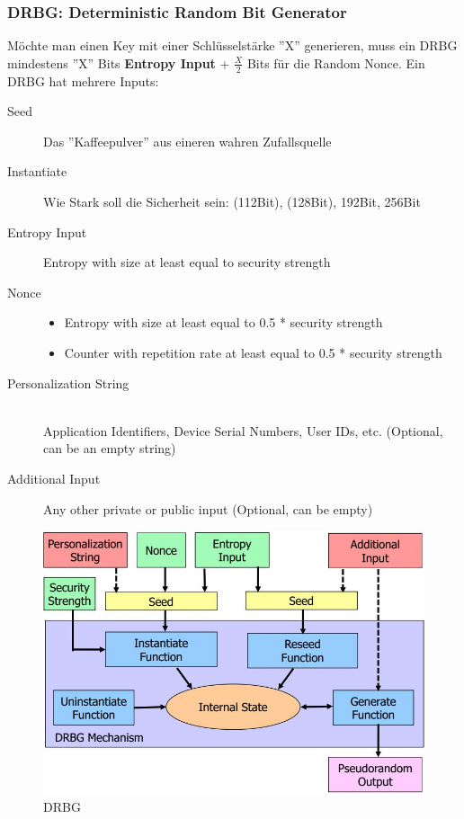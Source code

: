 \subsubsection{DRBG: Deterministic Random Bit Generator}
Möchte man einen Key mit einer Schlüsselstärke ''X'' generieren, muss ein DRBG mindestens ''X'' Bits \textbf{Entropy Input} + $\frac{X}{2}$ Bits für die Random Nonce. Ein DRBG hat mehrere Inputs:


\begin{description}
	\item[Seed]	Das ''Kaffeepulver'' aus eineren wahren Zufallsquelle
	\item[Instantiate] Wie Stark soll die Sicherheit sein: (112Bit), (128Bit), 192Bit, 256Bit
	\item[Entropy Input] Entropy with size at least equal to security strength
	\item[Nonce] \hfill 
	\begin{itemize} 
		\item Entropy with size at least equal to 0.5 * security strength
		\item Counter with repetition rate at least equal to 0.5 * security strength
	\end{itemize}
	\item[Personalization String]  \hfill \\
	Application Identifiers, Device Serial Numbers, User IDs, etc. (Optional, can be an empty string)
	\item[Additional Input] Any other private or public input (Optional, can be empty)
\end{description}
\begin{figure}[h]
\centering
\includegraphics[width=0.5\linewidth]{images/drbg}
\caption{DRBG}
\label{fig:drbg}
\end{figure}

